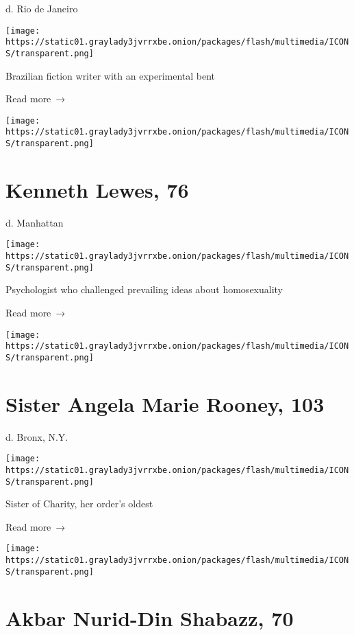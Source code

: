 d. Rio de Janeiro

\texttt{[image: https://static01.graylady3jvrrxbe.onion/packages/flash/multimedia/ICONS/transparent.png]}

Brazilian fiction writer with an experimental bent

 Read more~→

\href{https://www.nytimes3xbfgragh.onion/2020/06/26/science/kenneth-lewes-dead-coronavirus.html}{}

\texttt{[image: https://static01.graylady3jvrrxbe.onion/packages/flash/multimedia/ICONS/transparent.png]}

\hypertarget{kenneth-lewes-76}{%
\section{Kenneth Lewes, 76}\label{kenneth-lewes-76}}

d. Manhattan

\texttt{[image: https://static01.graylady3jvrrxbe.onion/packages/flash/multimedia/ICONS/transparent.png]}

Psychologist who challenged prevailing ideas about homosexuality

 Read more~→

\href{https://www.nytimes3xbfgragh.onion/2020/06/26/obituaries/Angela-Rooney-dead-coronavirus.html}{}

\texttt{[image: https://static01.graylady3jvrrxbe.onion/packages/flash/multimedia/ICONS/transparent.png]}

\hypertarget{sister-angela-marie-rooney-103}{%
\section{Sister Angela Marie Rooney,
103}\label{sister-angela-marie-rooney-103}}

d. Bronx, N.Y.

\texttt{[image: https://static01.graylady3jvrrxbe.onion/packages/flash/multimedia/ICONS/transparent.png]}

Sister of Charity, her order's oldest

 Read more~→

\href{https://www.nytimes3xbfgragh.onion/2020/06/25/obituaries/akbar-nurid-din-shabazz-dead-coronavirus.html}{}

\texttt{[image: https://static01.graylady3jvrrxbe.onion/packages/flash/multimedia/ICONS/transparent.png]}

\hypertarget{akbar-nurid-din-shabazz-70}{%
\section{Akbar Nurid-Din Shabazz, 70}\label{akbar-nurid-din-shabazz-70}}

